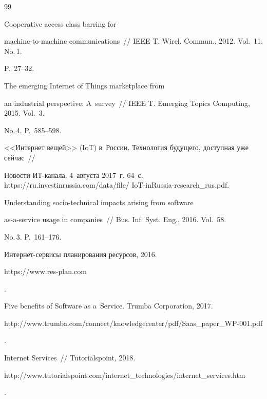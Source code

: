 {{\begin{thebibliography}{99}


 Cooperative access class barring for 


machine-to-machine communications~/\!\!/ IEEE T. Wirel. Commun., 2012. Vol.~11. No.\,1. 


P.~27--32.




 The emerging Internet of Things marketplace from 


an industrial perspective: A~survey~/\!\!/ IEEE T. Emerging Topics Computing, 2015. Vol.~3. 


No.\,4. P.~585--598. 




<<Интернет вещей>> (IoT) в~России. Технология будущего, доступная уже сейчас~/\!\!/ 


Новости ИТ-канала, 4~августа 2017~г. 64~с.  {\sf https://ru.investinrussia.com/data/file/ IoT-inRussia-research\_rus.pdf}.







 Understanding socio-technical impacts arising from software  


as-a-service usage in companies~/\!\!/ Bus.  Inf. Syst. Eng., 2016. Vol.~58. 


No.\,3. P.~161--176.







 Интернет-сервисы планирования ресурсов, 2016. {\sf  


https://www.res-plan.com}.







Five benefits of Software as a~Service. Trumba Corporation, 2017. {\sf 


http://www.trumba.\linebreak com/connect/knowledgecenter/pdf/Saas\_paper\_WP-001.pdf}.




Internet Services~/\!\!/ Tutorialspoint, 2018. {\sf 


http://www.tutorialspoint.com/internet\_\linebreak technologies/internet\_services.htm}.






\end{thebibliography}}}
